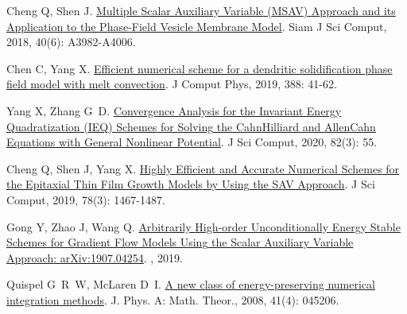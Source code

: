 \begin{thebibliography}{77}
    Cheng Q, Shen J.
    \newblock \href{https://epubs.siam.org/doi/10.1137/18M1166961}{Multiple {{Scalar Auxiliary Variable}} ({{MSAV}}) {{Approach}} and its {{Application}} to the {{Phase-Field Vesicle Membrane Model}}}\allowbreak[J].
    \newblock Siam J Sci Comput, 2018, 40\allowbreak (6): A3982-A4006.
    
    Chen C, Yang X.
    \newblock \href{https://www.sciencedirect.com/science/article/pii/S0021999119302001}{Efficient numerical scheme for a dendritic solidification phase field model with melt convection}\allowbreak[J].
    \newblock J Comput Phys, 2019, 388: 41-62.
    
    Yang X, Zhang G~D.
    \newblock \href{https://doi.org/10.1007/s10915-020-01151-x}{Convergence {{Analysis}} for the {{Invariant Energy Quadratization}} ({{IEQ}}) {{Schemes}} for {{Solving}} the {{Cahn}}{\textendash}{{Hilliard}} and {{Allen}}{\textendash}{{Cahn Equations}} with {{General Nonlinear Potential}}}\allowbreak[J].
    \newblock J Sci Comput, 2020, 82\allowbreak (3): 55.
    
    Cheng Q, Shen J, Yang X.
    \newblock \href{https://doi.org/10.1007/s10915-018-0832-5}{Highly {{Efficient}} and {{Accurate Numerical Schemes}} for the {{Epitaxial Thin Film Growth Models}} by {{Using}} the {{SAV Approach}}}\allowbreak[J].
    \newblock J Sci Comput, 2019, 78\allowbreak (3): 1467-1487.
    
    Gong Y, Zhao J, Wang Q.
    \newblock \href{http://arxiv.org/abs/1907.04254}{Arbitrarily {{High-order Unconditionally Energy Stable Schemes}} for {{Gradient Flow Models Using}} the {{Scalar Auxiliary Variable Approach}}: arXiv:1907.04254}\allowbreak[M].
    , 2019.
    
    Quispel G~R~W, McLaren D~I.
    \newblock \href{https://iopscience.iop.org/article/10.1088/1751-8113/41/4/045206}{A new class of energy-preserving numerical integration methods}\allowbreak[J].
    \newblock J. Phys. A: Math. Theor., 2008, 41\allowbreak (4): 045206.
    

\end{thebibliography}
